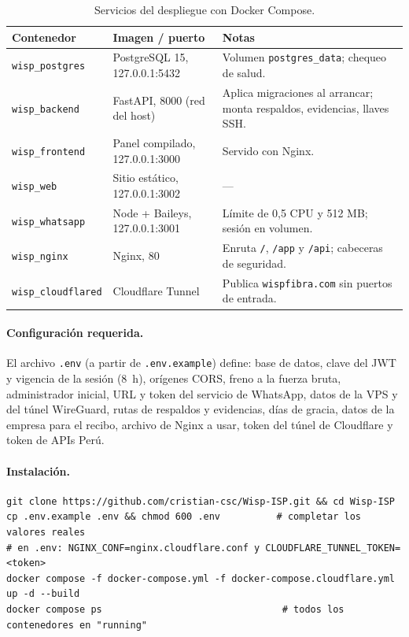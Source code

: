 \begin{table}[H]
\centering
\caption{Servicios del despliegue con Docker Compose.}
\label{tab:ce02-e3-servicios}
\small
\begin{tabularx}{\textwidth}{L{3.2cm}L{3.4cm}X}
\toprule
\textbf{Contenedor} & \textbf{Imagen / puerto} & \textbf{Notas} \\
\midrule
\texttt{wisp\_postgres} & PostgreSQL 15, 127.0.0.1:5432 & Volumen \texttt{postgres\_data}; chequeo de salud. \\
\texttt{wisp\_backend} & FastAPI, 8000 (red del host) & Aplica migraciones al arrancar; monta respaldos, evidencias, llaves SSH. \\
\texttt{wisp\_frontend} & Panel compilado, 127.0.0.1:3000 & Servido con Nginx. \\
\texttt{wisp\_web} & Sitio estático, 127.0.0.1:3002 & --- \\
\texttt{wisp\_whatsapp} & Node + Baileys, 127.0.0.1:3001 & Límite de 0,5 CPU y 512 MB; sesión en volumen. \\
\texttt{wisp\_nginx} & Nginx, 80 & Enruta \texttt{/}, \texttt{/app} y \texttt{/api}; cabeceras de seguridad. \\
\texttt{wisp\_cloudflared} & Cloudflare Tunnel & Publica \texttt{wispfibra.com} sin puertos de entrada. \\
\bottomrule
\end{tabularx}
\end{table}

\paragraph{Configuración requerida.} El archivo \texttt{.env} (a partir de
\texttt{.env.example}) define: base de datos, clave del JWT y vigencia de la sesión (8~h),
orígenes CORS, freno a la fuerza bruta, administrador inicial, URL y token del servicio de
WhatsApp, datos de la VPS y del túnel WireGuard, rutas de respaldos y evidencias, días de
gracia, datos de la empresa para el recibo, archivo de Nginx a usar, token del túnel de
Cloudflare y token de APIs Perú.

\paragraph{Instalación.}
\begin{lstlisting}[style=plano]
git clone https://github.com/cristian-csc/Wisp-ISP.git && cd Wisp-ISP
cp .env.example .env && chmod 600 .env          # completar los valores reales
# en .env: NGINX_CONF=nginx.cloudflare.conf y CLOUDFLARE_TUNNEL_TOKEN=<token>
docker compose -f docker-compose.yml -f docker-compose.cloudflare.yml up -d --build
docker compose ps                                # todos los contenedores en "running"
\end{lstlisting}

